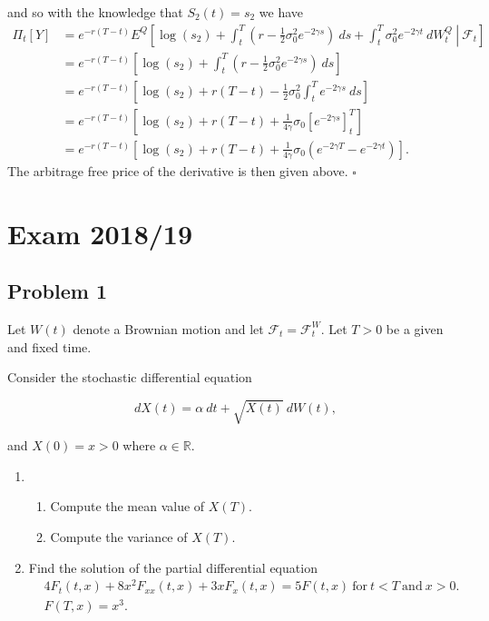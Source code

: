 \documentclass[a4paper,12pt,openany]{book}
\providecommand{\tightlist}{%
 \setlength{\itemsep}{0pt}\setlength{\parskip}{0pt}}
\begin{document}
and so with the knowledge that \(S_2(t)=s_2\) we have
\begin{align*}
\Pi_t[Y]&=e^{-r(T-t)}E^Q\left[\left.\log(s_2)+\int_t^T\left(r-\frac{1}{2}\sigma_0^2e^{-2\gamma s}\right)\ ds + \int_t^T \sigma_0^2e^{-2\gamma t}\ dW^Q_t\ \right\vert\ \mathcal{F}_t\right]\\
&=e^{-r(T-t)}\left[\log(s_2)+\int_t^T\left(r-\frac{1}{2}\sigma_0^2e^{-2\gamma s}\right)\ ds\right]\\
&=e^{-r(T-t)}\left[\log(s_2)+r(T-t)-\frac{1}{2}\sigma_0^2\int_t^Te^{-2\gamma s}\ ds\right]\\
&=e^{-r(T-t)}\left[\log(s_2)+r(T-t)+\frac{1}{4\gamma}\sigma_0\left[e^{-2\gamma s}\right]_t^T\right]\\
&=e^{-r(T-t)}\left[\log(s_2)+r(T-t)+\frac{1}{4\gamma}\sigma_0(e^{-2\gamma T}-e^{-2\gamma t})\right].
\end{align*}
The arbitrage free price of the derivative is then given above. \(\square\)

\noindent\makebox[\linewidth]{\rule{\textwidth}{0.4pt}}
\pagebreak

\hypertarget{exam-201819}{%
\section{Exam 2018/19}\label{exam-201819}}

\hypertarget{problem-1-1}{%
\subsection{Problem 1}\label{problem-1-1}}

Let \(W(t)\) denote a Brownian motion and let \(\mathcal{F}_t=\mathcal{F}_t^W\). Let \(T>0\) be a given and fixed time.

Consider the stochastic differential equation

\[
dX(t)=\alpha\ dt+\sqrt{X(t)}\ dW(t),
\]

and \(X(0)=x>0\) where \(\alpha\in\mathbb{R}\).

\begin{enumerate}
\def\labelenumi{\alph{enumi}.}
\item
  \begin{enumerate}
  \def\labelenumii{\roman{enumii}.}
  \tightlist
  \item
    Compute the mean value of \(X(T)\).
  \item
    Compute the variance of \(X(T)\).
  \end{enumerate}
\item
  Find the solution of the partial differential equation
  \begin{align*}
    &4F_t(t,x)+8x^2F_{xx}(t,x)+3xF_x(t,x)=5F(t,x)\ \text{for}\ t<T\ \text{and}\ x>0.\\
    &F(T,x)=x^3.
    \end{align*}
\end{enumerate}
\end{document}
